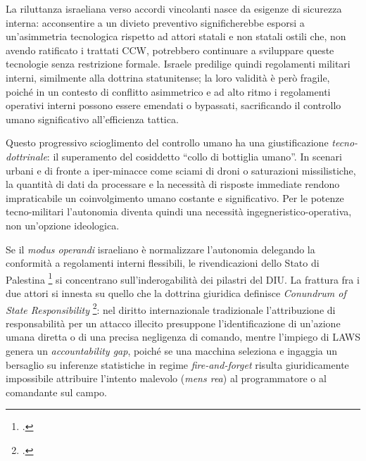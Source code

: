 \ifstampa\documentclass[a4paper,12pt,twoside,openright]{report}\else\documentclass[a4paper,12pt]{report}\fi
\begin{document}
La riluttanza israeliana verso accordi vincolanti nasce da esigenze di sicurezza
interna: acconsentire a un divieto preventivo significherebbe esporsi a
un'asimmetria tecnologica rispetto ad attori statali e non statali ostili che,
non avendo ratificato i trattati CCW, potrebbero continuare a sviluppare queste
tecnologie senza restrizione formale. Israele predilige quindi regolamenti
militari interni, similmente alla dottrina statunitense; la loro validità è però
fragile, poiché in un contesto di conflitto asimmetrico e ad alto ritmo i
regolamenti operativi interni possono essere emendati o bypassati, sacrificando
il controllo umano significativo all'efficienza tattica.
 
Questo progressivo scioglimento del controllo umano ha una giustificazione
\textit{tecno-dottrinale}: il superamento del cosiddetto ``collo di bottiglia
umano''. In scenari urbani e di fronte a iper-minacce come sciami di droni o
saturazioni missilistiche, la quantità di dati da processare e la necessità di
risposte immediate rendono impraticabile un coinvolgimento umano costante e
significativo. Per le potenze tecno-militari l'autonomia diventa quindi una
necessità ingegneristico-operativa, non un'opzione ideologica.
 
Se il \textit{modus operandi} israeliano è normalizzare l'autonomia delegando la
conformità a regolamenti interni flessibili, le rivendicazioni dello Stato di
Palestina \footcite{palestine_2023} si concentrano sull'inderogabilità dei
pilastri del DIU. La frattura fra i due attori si innesta su quello che la
dottrina giuridica definisce \textit{Conundrum of State Responsibility}
\footcite{state_resp_2025}: nel diritto internazionale tradizionale
l'attribuzione di responsabilità per un attacco illecito presuppone
l'identificazione di un'azione umana diretta o di una precisa negligenza di
comando, mentre l'impiego di LAWS genera un \textit{accountability gap}, poiché
se una macchina seleziona e ingaggia un bersaglio su inferenze statistiche in
regime \textit{fire-and-forget} risulta giuridicamente impossibile attribuire
l'intento malevolo (\textit{mens rea}) al programmatore o al comandante sul
campo.
 
\end{document}
